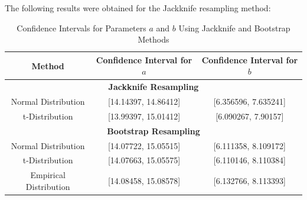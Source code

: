 \documentclass[]{article}
\begin{document}
\noindent The following results were obtained for the Jackknife resampling method:

%
%
%

\begin{table}[h]
	\centering
	\begin{tabular}{|c|c|c|}
		\hline
		\textbf{Method} & \textbf{Confidence Interval for $a$} & \textbf{Confidence Interval for $b$} \\
		\hline
		\multicolumn{3}{|c|}{\textbf{Jackknife Resampling}} \\
		\hline
		Normal Distribution & [14.14397, 14.86412] & [6.356596, 7.635241] \\
		t-Distribution & [13.99397, 15.01412] & [6.090267, 7.90157] \\
		\hline
		\multicolumn{3}{|c|}{\textbf{Bootstrap Resampling}} \\
		\hline
		Normal Distribution & [14.07722, 15.05515] & [6.111358, 8.109172] \\
		t-Distribution & [14.07663, 15.05575] & [6.110146, 8.110384] \\
		Empirical Distribution & [14.08458, 15.08578] & [6.132766, 8.113393] \\
		\hline
	\end{tabular}
	\caption{Confidence Intervals for Parameters $a$ and $b$ Using Jackknife and Bootstrap Methods}
	\label{tab:ci_results}
\end{table}
\end{document}
